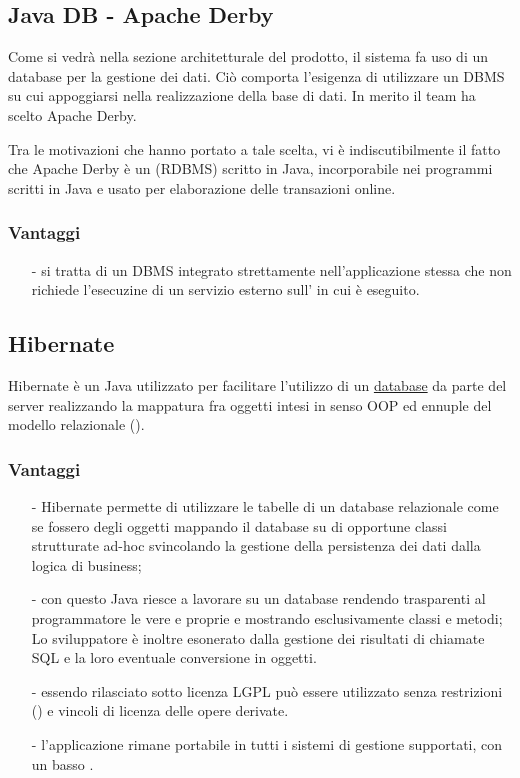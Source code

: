 \subsection{Java DB - Apache Derby}

Come si vedrà nella sezione architetturale del prodotto, il sistema fa uso di un database per la gestione dei dati. Ciò comporta l'esigenza di utilizzare un DBMS su cui appoggiarsi nella realizzazione della base di dati. In merito il team ha scelto Apache Derby.

Tra le motivazioni che hanno portato a tale scelta, vi è indiscutibilmente il fatto che Apache Derby è un  (RDBMS) scritto in Java, incorporabile nei programmi scritti in Java e usato per elaborazione delle transazioni online.

\subsubsection*{Vantaggi}
\begin{itemize}[noitemsep,nolistsep]
  \item[-] si tratta di un DBMS  integrato strettamente nell'applicazione stessa che non richiede l'esecuzine di un servizio esterno sull' in cui è eseguito.
\end{itemize}

\subsection{Hibernate}\label{sec:hibernate}

Hibernate è un  Java utilizzato per facilitare l'utilizzo di un \underline{database} da parte del server realizzando la mappatura fra oggetti intesi in senso OOP ed ennuple del modello relazionale ().

\subsubsection*{Vantaggi}
\begin{itemize}[noitemsep,nolistsep]
\item[-] Hibernate permette di utilizzare le tabelle di un database relazionale come se fossero degli oggetti mappando il database su di opportune classi strutturate ad-hoc svincolando la gestione della persistenza dei dati dalla logica di business;
\item[-] con questo  Java riesce a lavorare su un database rendendo trasparenti al programmatore le vere e proprie  e mostrando esclusivamente classi e metodi; Lo sviluppatore è inoltre esonerato dalla gestione dei risultati di chiamate SQL e la loro eventuale conversione in oggetti.
\item[-] essendo rilasciato sotto licenza LGPL può essere utilizzato senza restrizioni () e vincoli di licenza delle opere derivate.
\item[-] l'applicazione rimane portabile in tutti i sistemi di gestione supportati, con un basso .
\end{itemize}
\clearpage

